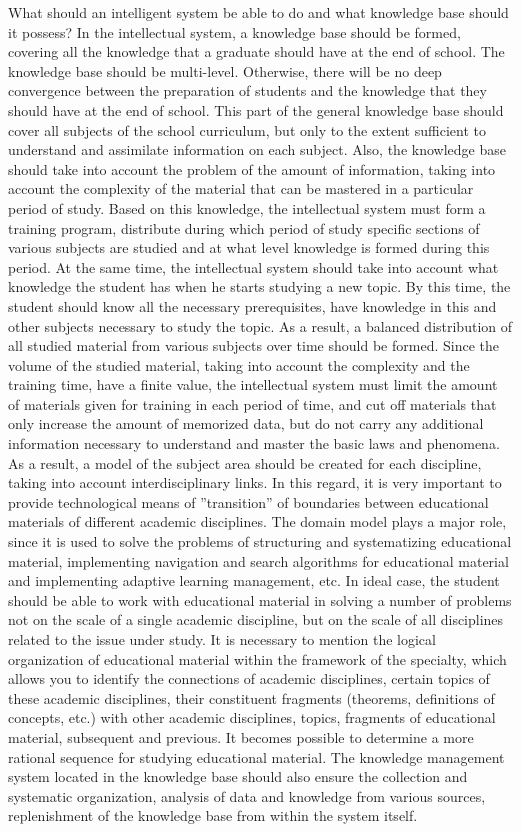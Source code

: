 \documentclass[a4paper, 10pt,twocolumn]{article}
\begin{document}
What should an intelligent system be able to do
and what knowledge base should it possess? In the
intellectual system, a knowledge base should be formed,
covering all the knowledge that a graduate should have
at the end of school. The knowledge base should be
multi-level. Otherwise, there will be no deep convergence
between the preparation of students and the knowledge
that they should have at the end of school. This part
of the general knowledge base should cover all subjects of the school curriculum, but only to the extent
sufficient to understand and assimilate information on
each subject. Also, the knowledge base should take
into account the problem of the amount of information,
taking into account the complexity of the material that
can be mastered in a particular period of study. Based
on this knowledge, the intellectual system must form a
training program, distribute during which period of study
specific sections of various subjects are studied and at
what level knowledge is formed during this period. At
the same time, the intellectual system should take into
account what knowledge the student has when he starts
studying a new topic. By this time, the student should
know all the necessary prerequisites, have knowledge
in this and other subjects necessary to study the topic.
As a result, a balanced distribution of all studied material from various subjects over time should be formed.
Since the volume of the studied material, taking into
account the complexity and the training time, have a
finite value, the intellectual system must limit the amount
of materials given for training in each period of time,
and cut off materials that only increase the amount
of memorized data, but do not carry any additional
information necessary to understand and master the basic
laws and phenomena. As a result, a model of the subject
area should be created for each discipline, taking into
account interdisciplinary links. In this regard, it is very
important to provide technological means of ”transition”
of boundaries between educational materials of different
academic disciplines. The domain model plays a major
role, since it is used to solve the problems of structuring
and systematizing educational material, implementing
navigation and search algorithms for educational material
and implementing adaptive learning management, etc.
In ideal case, the student should be able to work with
educational material in solving a number of problems
not on the scale of a single academic discipline, but
on the scale of all disciplines related to the issue under
study. It is necessary to mention the logical organization
of educational material within the framework of the
specialty, which allows you to identify the connections
of academic disciplines, certain topics of these academic
disciplines, their constituent fragments (theorems, definitions of concepts, etc.) with other academic disciplines,
topics, fragments of educational material, subsequent
and previous. It becomes possible to determine a more
rational sequence for studying educational material. The
knowledge management system located in the knowledge
base should also ensure the collection and systematic
organization, analysis of data and knowledge from various sources, replenishment of the knowledge base from
within the system itself.
\end{document}

